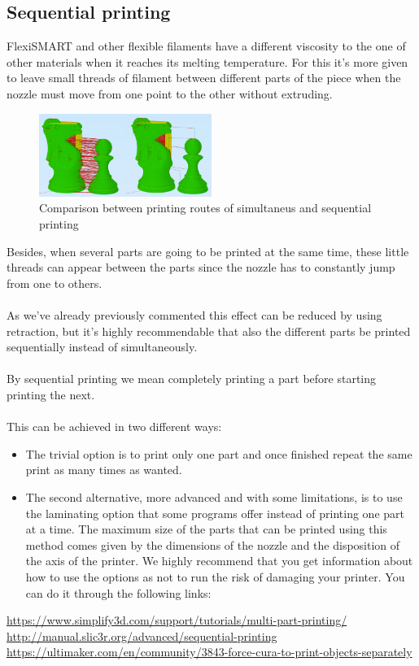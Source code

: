 \documentclass[11pt,a4paper]{article}
\begin{document}
	\subsection{Sequential printing}
FlexiSMART and other flexible filaments have a different viscosity to the one of other materials when it reaches its melting temperature. For this it’s more given to leave small threads of filament between different parts of the piece when the nozzle must move from one point to the other without extruding.
\begin{figure}[H]
\centering
\includegraphics[width=0.5\textwidth,cfbox=azul_marcos 4pt 0pt]{FOTOS/SEQUENTIALPRINTING}
\caption*{Comparison between printing routes of simultaneus and sequential printing}
\end{figure}
Besides, when several parts are going to be printed at the same time, these little threads can appear between the parts since the nozzle has to constantly jump from one to others.
\\\\
As we’ve already previously commented this effect can be reduced by using retraction, but it’s highly recommendable that also the different parts be printed sequentially instead of simultaneously.
\\\\
By sequential printing we mean completely printing a part before starting printing the next.
\\\\
This can be achieved in two different ways:
\begin{itemize}
\item The trivial option is to print only one part and once finished repeat the same print as many times as wanted.
\item The second alternative, more advanced and with some limitations, is to use the laminating option that some programs offer instead of printing one part at a time. The maximum size of the parts that can be printed using this method comes given by the dimensions of the nozzle and the disposition of the axis of the printer. We highly recommend that you get information about how to use the options as not to run the risk of damaging your printer. You can do it through the following links:
\end{itemize}
\url{https://www.simplify3d.com/support/tutorials/multi-part-printing/}\\
\url{http://manual.slic3r.org/advanced/sequential-printing}\\
\url{https://ultimaker.com/en/community/3843-force-cura-to-print-objects-separately}
\end{document}
